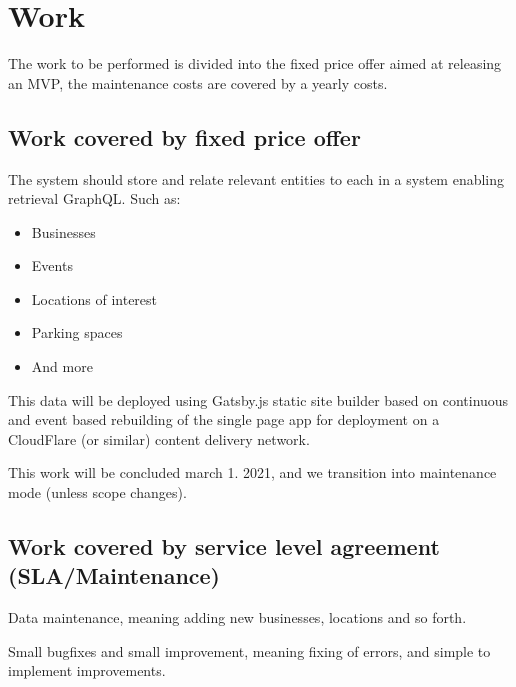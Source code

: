 \section{Work}

The work to be performed is divided into the fixed price offer aimed at releasing an MVP, the maintenance costs are covered by a yearly costs.

\subsection{Work covered by fixed price offer}

The system should store and relate relevant entities to each in a system enabling retrieval GraphQL. Such as:

\begin{itemize}
\item Businesses
\item Events
\item Locations of interest
\item Parking spaces
\item And more
\end{itemize}

This data will be deployed using Gatsby.js static site builder based on continuous and event based rebuilding of the single page app for deployment on a CloudFlare (or similar) content delivery network.

This work will be concluded march 1. 2021, and we transition into maintenance mode (unless scope changes).

\subsection{Work covered by service level agreement (SLA/Maintenance)}

Data maintenance, meaning adding new businesses, locations and so forth. 

Small bugfixes and small improvement, meaning fixing of errors, and simple to implement improvements.
